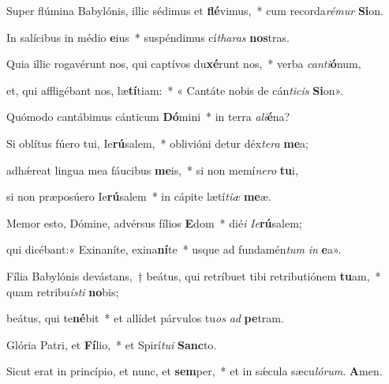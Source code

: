 \item Super flúmina Babylónis, illic sédimus et \textbf{flé}vimus,~* cum recorda\textit{rémur} \textbf{Si}on.

\item In salícibus in médio \textbf{e}ius~* suspéndimus cí\textit{tharas} \textbf{nos}tras.

\item Quia illic rogavérunt nos, qui captívos du\textbf{xé}runt nos,~* verba \textit{canti}\textbf{ó}num,

\item et, qui affligébant nos, læ\textbf{tí}tiam:~* « Cantáte nobis de cán\textit{ticis} \textbf{Si}on».

\item Quómodo cantábimus cánticum \textbf{Dó}mini~* in terra \textit{ali}\textbf{é}na?

\item Si oblítus fúero tui, Ie\textbf{rú}salem,~* oblivióni detur déx\textit{tera} \textbf{me}a;

\item adhǽreat lingua mea fáucibus \textbf{me}is,~* si non memí\textit{nero} \textbf{tu}i,

\item si non præposúero Ie\textbf{rú}salem~* in cápite lætí\textit{tiæ} \textbf{me}æ.

\item Memor esto, Dómine, advérsus fílios \textbf{E}dom~* dié\textit{i} \textit{Ie}\textbf{rú}salem;

\item qui dicébant:« Exinaníte, exina\textbf{ní}te~* usque ad fundamén\textit{tum} \textit{in} \textbf{e}a».

\item Fília Babylónis devástans,~† beátus, qui retríbuet tibi retributiónem \textbf{tu}am,~* quam retribu\textit{ísti} \textbf{no}bis;

\item beátus, qui te\textbf{né}bit~* et allídet párvulos tu\textit{os} \textit{ad} \textbf{pe}tram.

\item Glória Patri, et \textbf{Fí}lio,~* et Spirí\textit{tui} \textbf{Sanc}to.

\item Sicut erat in princípio, et nunc, et \textbf{sem}per,~* et in sǽcula sæcu\textit{lórum}. \textbf{A}men.